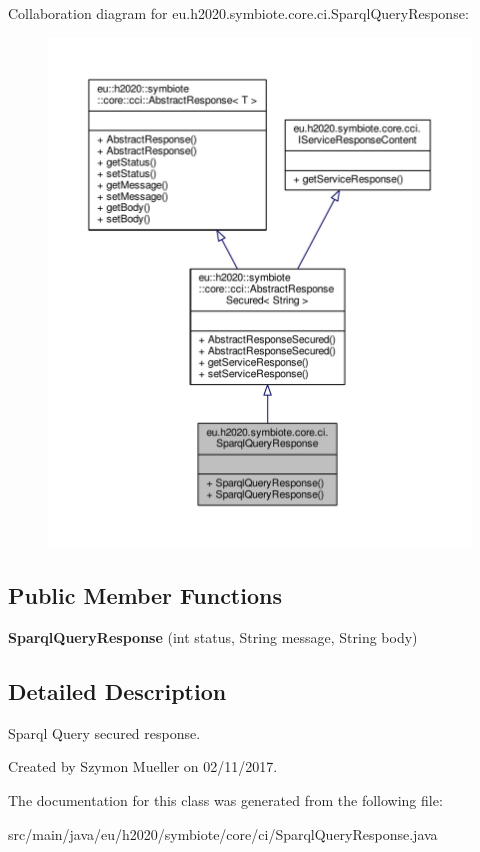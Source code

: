 Collaboration diagram for eu.\+h2020.\+symbiote.\+core.\+ci.\+Sparql\+Query\+Response\+:\nopagebreak
\begin{figure}[H]
\begin{center}
\leavevmode
\includegraphics[width=350pt]{classeu_1_1h2020_1_1symbiote_1_1core_1_1ci_1_1SparqlQueryResponse__coll__graph}
\end{center}
\end{figure}
\subsection*{Public Member Functions}
\begin{DoxyCompactItemize}
\item 
\mbox{\label{classeu_1_1h2020_1_1symbiote_1_1core_1_1ci_1_1SparqlQueryResponse_a1fe0bf88d7c93ac85d2ce0459ba6eec0}} 
{\bfseries Sparql\+Query\+Response} (int status, String message, String body)
\end{DoxyCompactItemize}


\subsection{Detailed Description}
Sparql Query secured response.

Created by Szymon Mueller on 02/11/2017. 

The documentation for this class was generated from the following file\+:\begin{DoxyCompactItemize}
\item 
src/main/java/eu/h2020/symbiote/core/ci/Sparql\+Query\+Response.\+java\end{DoxyCompactItemize}
